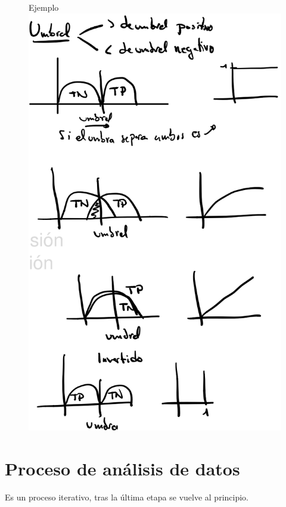 \documentclass[12pt]{report} %
\begin{document}
\begin{figure}[H]
	Ejemplo
	{\includegraphics[scale=.2]{Untitled 13.png}}
\end{figure}

\section{Proceso de análisis de
datos}

Es un proceso iterativo, tras la última etapa se vuelve al principio.
\end{document}
